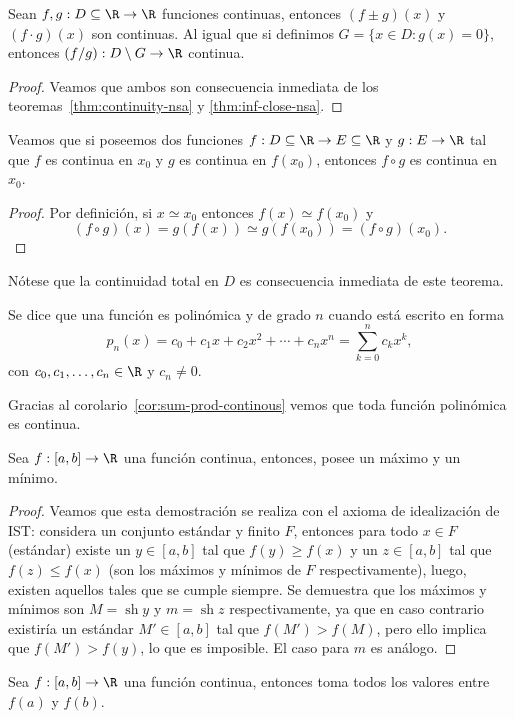 \documentclass[11pt,oneside,a4paper]{book}
\DeclareMathOperator{\sh}{sh}
\begin{document}
\begin{cor}\label{cor:sum-prod-continous}
Sean $f,g:D\subseteq\R\rightarrow\R$ funciones continuas, entonces $(f\pm g)(x)$ y $(f\cdot g)(x)$ son continuas. Al igual que si definimos $G=\{x\in D:g(x)=0\}$, entonces $(f/g):D\setminus G\rightarrow\R$ continua.
\end{cor}
\begin{proof}
Veamos que ambos son consecuencia inmediata de los teoremas~\ref{thm:continuity-nsa} y \ref{thm:inf-close-nsa}.
\end{proof}
\begin{thm}
Veamos que si poseemos dos funciones $f:D\subseteq\R\rightarrow E\subseteq\R$ y $g:E\rightarrow\R$ tal que $f$ es continua en $x_0$ y $g$ es continua en $f(x_0)$, entonces $f\circ g$ es continua en $x_0$.
\end{thm}
\begin{proof}
Por definición, si $x\simeq x_0$ entonces $f(x)\simeq f(x_0)$ y
$$(f\circ g)(x)=g(f(x))\simeq g(f(x_0))=(f\circ g)(x_0).$$
\end{proof}
Nótese que la continuidad total en $D$ es consecuencia inmediata de este teorema.
\begin{mydef}
Se dice que una función es polinómica y de grado $n$ cuando está escrito en forma
$$p_n(x)=c_0+c_1x+c_2x^2+\cdots+c_nx^n=\sum_{k=0}^n c_kx^k,$$
con $c_0,c_1,\dots,c_n\in\R$ y $c_n\neq 0$.
\end{mydef}
Gracias al corolario~\ref{cor:sum-prod-continous} vemos que toda función polinómica es continua.
\begin{thm}
Sea $f:[a,b]\rightarrow\R$ una función continua, entonces, posee un máximo y un mínimo.
\end{thm}
\begin{proof}
Veamos que esta demostración se realiza con el axioma de idealización de IST: considera un conjunto estándar y finito $F$, entonces para todo $x\in F$ (estándar) existe un $y\in [a,b]$ tal que $f(y)\geq f(x)$ y un $z\in [a,b]$ tal que $f(z)\leq f(x)$ (son los máximos y mínimos de $F$ respectivamente), luego, existen aquellos tales que se cumple siempre. Se demuestra que los máximos y mínimos son $M=\sh y$ y $m=\sh z$ respectivamente, ya que en caso contrario existiría un estándar $M'\in[a,b]$ tal que $f(M')\gt f(M)$, pero ello implica que $f(M')\gt f(y)$, lo que es imposible. El caso para $m$ es análogo.
\end{proof}
\begin{thm}
Sea $f:[a,b]\rightarrow\R$ una función continua, entonces toma todos los valores entre $f(a)$ y $f(b)$.
\end{thm}
\end{document}
